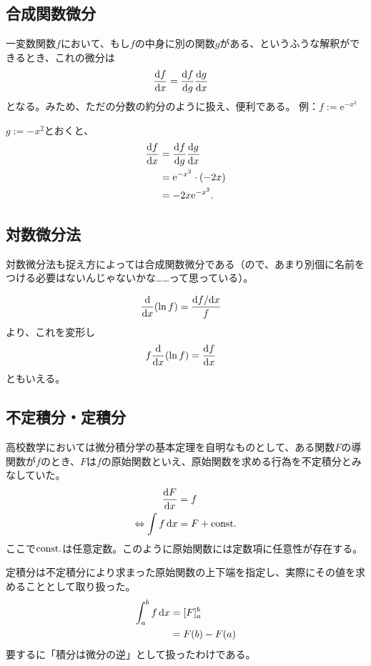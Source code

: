 \subsection{合成関数微分}
一変数関数$f$において、もし$f$の中身に別の関数$g$がある、というふうな解釈ができるとき、これの微分は
\begin{align}
    \frac{\mathrm{d}f}{\mathrm{d}x} & =\frac{\mathrm{d}f}{\mathrm{d}g}\frac{\mathrm{d}g}{\mathrm{d}x}\label{eq:1.4}
\end{align}
となる。みため、ただの分数の約分のように扱え、便利である。
\baselineskip
例：$f:=\mathrm{e}^{-x^2}$

$g:=-x^2$とおくと、
\begin{align*}
    \diff{f}{x} & =\diff{f}{g}\diff{g}{x}           \\
                & =\mathrm{e}^{-x^2}\cdot\pare{-2x} \\
                & =-2x\mathrm{e}^{-x^2}.
\end{align*}
\subsection{対数微分法}
対数微分法も捉え方によっては合成関数微分である（ので、あまり別個に名前をつける必要はないんじゃないかな……って思っている）。

\begin{align*}
    \opdiff{x}\pare{\ln f} & =\frac{\df/\dx}{f}
\end{align*}
より、これを変形し
\begin{align}
    f\opdiff{x}\pare{\ln f} & =\diff{f}{x}
\end{align}
ともいえる。

\subsection{不定積分・定積分}
高校数学においては微分積分学の基本定理を自明なものとして、ある関数$F$の導関数が$f$のとき、$F$は$f$の原始関数といえ、原始関数を求める行為を不定積分とみなしていた。
\begin{align}
    \begin{aligned}
        \frac{\mathrm{d}F}{\mathrm{d}x}                 & =f        \\
        \Leftrightarrow \int f\,\mathrm{d}x & =F+\mathrm{const.}
    \end{aligned}\label{eq:1.5}
\end{align}
ここで$\mathrm{const.}$は任意定数。このように原始関数には定数項に任意性が存在する。

定積分は不定積分により求まった原始関数の上下端を指定し、実際にその値を求めることとして取り扱った。
\begin{align}
    \begin{aligned}
        \int_a^b f\,\dx & =[F]_a^b             \\
                        & =F\pare{b}-F\pare{a}
    \end{aligned}\label{eq:1.6}
\end{align}
要するに「積分は微分の逆」として扱ったわけである。
